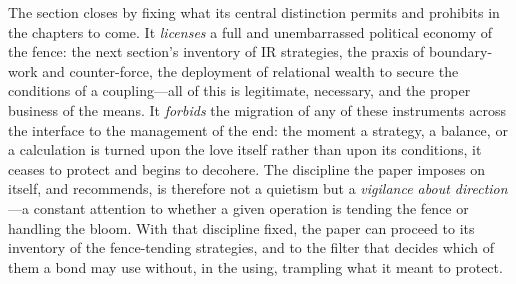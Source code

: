 The section closes by fixing what its central distinction permits and prohibits in the chapters to come. It \emph{licenses} a full and unembarrassed political economy of the fence: the next section's inventory of IR strategies, the praxis of boundary-work and counter-force, the deployment of relational wealth to secure the conditions of a coupling---all of this is legitimate, necessary, and the proper business of the means. It \emph{forbids} the migration of any of these instruments across the interface to the management of the end: the moment a strategy, a balance, or a calculation is turned upon the love itself rather than upon its conditions, it ceases to protect and begins to decohere. The discipline the paper imposes on itself, and recommends, is therefore not a quietism but a \emph{vigilance about direction}---a constant attention to whether a given operation is tending the fence or handling the bloom. With that discipline fixed, the paper can proceed to its inventory of the fence-tending strategies, and to the filter that decides which of them a bond may use without, in the using, trampling what it meant to protect.
